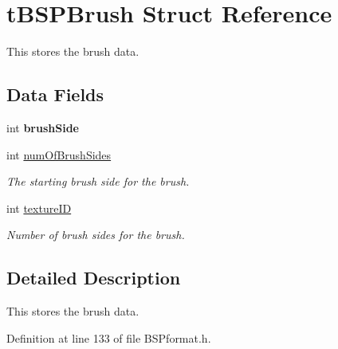 \hypertarget{structt_b_s_p_brush}{}\section{t\+B\+S\+P\+Brush Struct Reference}
\label{structt_b_s_p_brush}


This stores the brush data.  


\subsection*{Data Fields}
\begin{DoxyCompactItemize}
\item 
int {\bfseries brush\+Side}\hypertarget{structt_b_s_p_brush_a09f43b88ae55bbb78bd135e1fb3cfc29}{}\label{structt_b_s_p_brush_a09f43b88ae55bbb78bd135e1fb3cfc29}

\item 
int \hyperlink{structt_b_s_p_brush_a3ed7a8bacbf3d015ea51893ec4897e49}{num\+Of\+Brush\+Sides}\hypertarget{structt_b_s_p_brush_a3ed7a8bacbf3d015ea51893ec4897e49}{}\label{structt_b_s_p_brush_a3ed7a8bacbf3d015ea51893ec4897e49}

\begin{DoxyCompactList}\small\item\em The starting brush side for the brush. \end{DoxyCompactList}\item 
int \hyperlink{structt_b_s_p_brush_aa96129f6b9029dc0607ad647e311a8f7}{texture\+ID}\hypertarget{structt_b_s_p_brush_aa96129f6b9029dc0607ad647e311a8f7}{}\label{structt_b_s_p_brush_aa96129f6b9029dc0607ad647e311a8f7}

\begin{DoxyCompactList}\small\item\em Number of brush sides for the brush. \end{DoxyCompactList}\end{DoxyCompactItemize}


\subsection{Detailed Description}
This stores the brush data. 

Definition at line 133 of file B\+S\+Pformat.\+h.

